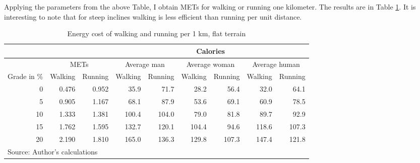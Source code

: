 \documentclass{article}[12pt,letterpaper]
\begin{document}
Applying the parameters from the above Table, I obtain METs for walking or running one kilometer. The results are in Table \ref{tab:mets-slope}. 
It is interesting to note that for steep inclines walking is less efficient than running per unit distance.
\begin{table}[ht]
  \begin{center}
    \caption{Energy cost of walking and running per 1 km, flat terrain}
    \label{tab:mets-slope}
    \begin{tabular}{|r|r|r||r|r|r|r|r|r|}
      \hline     
      \multicolumn{3}{|c||}{} & \multicolumn{6}{|c|}{Calories} \\
      \hline
      \multicolumn{1}{|c|}{} & \multicolumn{2}{|c||}{METs} & \multicolumn{2}{|c|}{Average man} & \multicolumn{2}{|c|}{Average woman} & \multicolumn{2}{|c|}{Average human} \\
      \hline     
      Grade in \%	&	Walking	&	Running	&	Walking	&	Running	&	Walking	&	Running	&	Walking	&	Running	\\
      \hline
      0	&	0.476	&	0.952	&	35.9	&	71.7	&	28.2	&	56.4	&	32.0	&	64.1	\\
      5	&	0.905	&	1.167	&	68.1	&	87.9	&	53.6	&	69.1	&	60.9	&	78.5	\\
      10	&	1.333	&	1.381	&	100.4	&	104.0	&	79.0	&	81.8	&	89.7	&	92.9	\\
      15	&	1.762	&	1.595	&	132.7	&	120.1	&	104.4	&	94.6	&	118.6	&	107.3	\\
      20	&	2.190	&	1.810	&	165.0	&	136.3	&	129.8	&	107.3	&	147.4	&	121.8	\\
      \hline
      \multicolumn{9}{l}{Source: Author's calculations}
    \end{tabular}
  \end{center}
\end{table}
\end{document}
